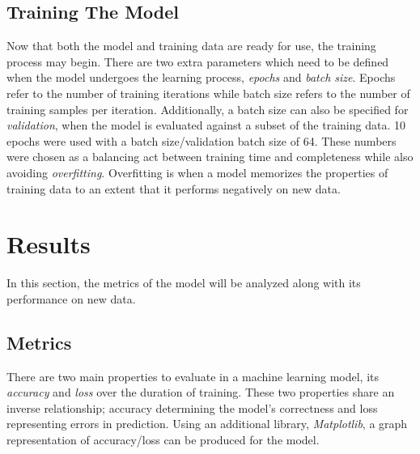 \documentclass[11pt,conference]{IEEEtran}
\begin{document}
\subsection{Training The Model}
Now that both the model and training data are ready for use, the training 
process may begin. There are two extra parameters which need to be defined when
the model undergoes the learning process, \emph{epochs} and \emph{batch size}.
Epochs refer to the number of training iterations while batch size
refers to the number of training samples per iteration. Additionally, a batch
size can also be specified for \emph{validation}, when the model is evaluated
against a subset of the training data. 10 epochs were used
with a batch size/validation batch size of 64. These numbers were chosen as a balancing act between
training time and completeness while also avoiding \emph{overfitting}.
Overfitting is when a model memorizes the properties of 
training data to an extent that it performs negatively on new data. 

\section{Results}
In this section, the metrics of the model will be analyzed along with its
performance on new data.

\subsection{Metrics}
There are two main properties to evaluate in a machine learning model, its
\emph{accuracy} and \emph{loss} over the duration of training. These two
properties share an inverse relationship; accuracy determining the model's
correctness and loss representing errors in prediction. Using an additional
library, \emph{Matplotlib}, a graph representation of accuracy/loss can be
produced for the model.
\end{document}
